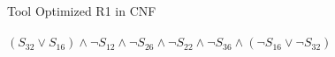 \documentclass[a4paper, 14pt]{amsart}
\begin{document}
Tool Optimized R1 in CNF
\\
\\
$
(S_{32} \vee S_{16}) \wedge \neg S_{12} \wedge \neg S_{26} \wedge \neg S_{22} \wedge \neg S_{36} \wedge (\neg S_{16} \vee \neg S_{32})
$
\end{document}
